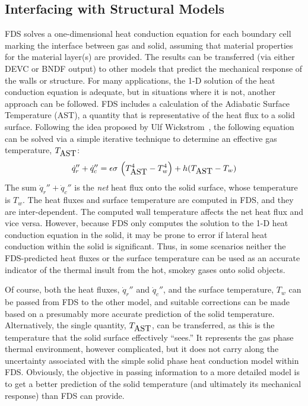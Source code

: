\documentclass[11pt]{book}
\newcommand{\be}{\begin{equation}}
\newcommand{\ee}{\end{equation}}
\begin{document}
\subsection{Interfacing with Structural Models}
\label{info:AST}

FDS solves a one-dimensional heat conduction equation for each boundary cell marking the interface
between gas and solid, assuming that material properties for the material layer(s) are provided. The results can
be transferred (via either {\ct DEVC} or {\ct BNDF} output) to other models that predict the
mechanical response of the walls or structure. For many applications, the 1-D solution of the heat conduction
equation is adequate, but in situations where it is not, another approach can be followed. FDS includes a
calculation of the Adiabatic Surface Temperature (AST), a quantity that is representative of the heat flux to a
solid surface. Following the idea proposed by Ulf Wickstrom~\cite{SFPE:Wickstrom}, the following equation can
be solved via a simple iterative technique to determine an effective gas temperature, $T_{\hbox{AST}}$:
\be \dot{q}_r'' + \dot{q}_c'' = \epsilon \sigma \, \left( T_{\hbox{AST}}^4 - T_w^4 \right) + h (T_{\hbox{AST}} - T_w )  \ee
The sum $\dot{q}_r'' + \dot{q}_c''$ is the {\em net} heat flux onto the solid surface, whose temperature is
$T_w$. The heat fluxes and surface temperature are computed in FDS, and they are inter-dependent. The computed wall
temperature affects the net heat flux and vice versa. However, because FDS only computes the solution to the
1-D heat conduction equation in the solid, it may be prone to error if lateral heat conduction within the solid is
significant. Thus, in some scenarios neither the FDS-predicted heat fluxes or the surface temperature can be used as
an accurate indicator of the thermal insult from the hot, smokey gases onto solid objects.

Of course, both the heat fluxes, $\dot{q}_r''$ and $\dot{q}_c''$, and the surface temperature, $T_w$ can be passed from FDS to the
other model, and suitable corrections can be made based on a presumably more accurate prediction of the solid temperature.
Alternatively, the single quantity, $T_{\hbox{AST}}$, can be transferred, as this is the temperature that the solid
surface effectively ``sees.'' It represents the gas phase thermal environment, however complicated, but it does not
carry along the uncertainty associated with the simple solid phase heat conduction model within FDS. Obviously, the
objective in passing information to a more detailed model is to get a better prediction of the solid temperature (and
ultimately its mechanical response) than FDS can provide.
\end{document}
